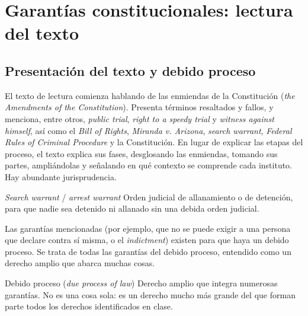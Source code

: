\documentclass[12pt,oneside]{book}
\begin{document}
\chapter[Garantías constitucionales]{Garantías constitucionales: lectura del texto}

\section{Presentación del texto y debido proceso}

El texto de lectura comienza hablando de las enmiendas de la Constitución (\textit{the Amendments of the Constitution}). Presenta términos resaltados y fallos, y menciona, entre otros, \textit{public trial}, \textit{right to a speedy trial} y \textit{witness against himself}, así como el \textit{Bill of Rights}, \textit{Miranda v. Arizona}, \textit{search warrant}, \textit{Federal Rules of Criminal Procedure} y la Constitución. En lugar de explicar las etapas del proceso, el texto explica sus fases, desglosando las enmiendas, tomando sus partes, ampliándolas y señalando en qué contexto se comprende cada instituto. Hay abundante jurisprudencia.

\begin{definition}{\textit{Search warrant} / \textit{arrest warrant}}
Orden judicial de allanamiento o de detención, para que nadie sea detenido ni allanado sin una debida orden judicial.
\end{definition}

Las garantías mencionadas (por ejemplo, que no se puede exigir a una persona que declare contra sí misma, o el \textit{indictment}) existen para que haya un debido proceso. Se trata de todas las garantías del debido proceso, entendido como un derecho amplio que abarca muchas cosas.

\begin{definition}{Debido proceso (\textit{due process of law})}
Derecho amplio que integra numerosas garantías. No es una cosa sola: es un derecho mucho más grande del que forman parte todos los derechos identificados en clase.
\end{definition}
\end{document}
